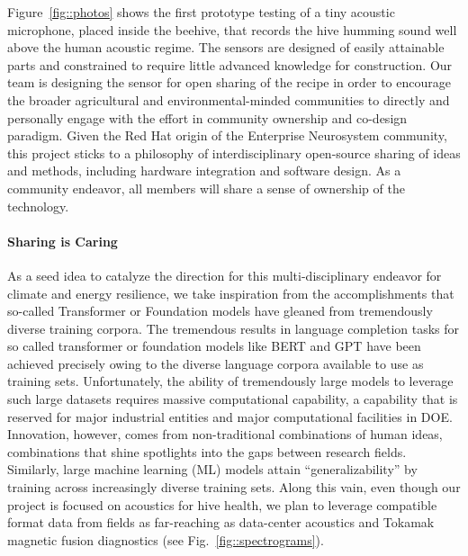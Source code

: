 Figure~\ref{fig::photos} shows the first prototype testing of a tiny acoustic microphone, placed inside the beehive, that records the hive humming sound well above the human acoustic regime.
The sensors are designed of easily attainable parts and constrained to require little advanced knowledge for construction.
Our team is designing the sensor for open sharing of the recipe in order to encourage the broader agricultural and environmental-minded communities to directly and personally engage with the effort in community ownership and co-design paradigm.
Given the Red Hat origin of the Enterprise Neurosystem community, this project sticks to a philosophy of interdisciplinary open-source sharing of ideas and methods, including hardware integration and software design.
As a community endeavor, all members will share a sense of ownership of the technology.

\paragraph{Sharing is Caring}
As a seed idea to catalyze the direction for this multi-disciplinary endeavor for climate and energy resilience, we take inspiration from the accomplishments that so-called Transformer \cite{Attention2017} or Foundation \cite{StanfordFoundationPaper} models have gleaned from tremendously diverse training corpora.
The tremendous results in language completion tasks for so called transformer or foundation models like BERT \cite{bert} and GPT \cite{GPT2018} have been achieved precisely owing to the diverse language corpora available to use as training sets.
Unfortunately, the ability of tremendously large models to leverage such large datasets requires massive computational capability, a capability that is reserved for major industrial entities and major computational facilities in DOE.
Innovation, however, comes from non-traditional combinations of human ideas, combinations that shine spotlights into the gaps between research fields.
Similarly, large machine learning (ML) models attain ``generalizability'' by training across increasingly diverse training sets.
Along this vain, even though our project is focused on acoustics for hive health, we plan to leverage compatible format data from fields as far-reaching as data-center acoustics and Tokamak magnetic fusion diagnostics (see Fig.~\ref{fig::spectrograms}).


